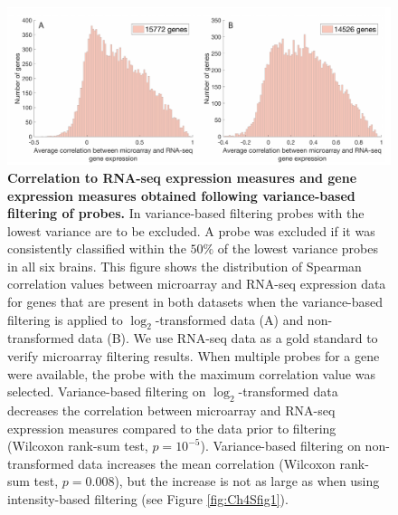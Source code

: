 \begin{figure}[h!]
  \centering
    \includegraphics[width=1\textwidth]{Chapter4/FigureS3.pdf}
\caption{\textbf{Correlation to RNA-seq expression measures and gene expression measures obtained following variance-based filtering of probes.}
In variance-based filtering probes with the lowest variance are to be excluded. A probe was excluded if it was consistently classified within the $50\%$ of the  lowest variance probes in all six brains. This figure shows the distribution of Spearman correlation values between microarray and RNA-seq expression data for genes that are present in both datasets when the variance-based filtering is applied to $\log_2$-transformed data (A) and non-transformed data (B). We use RNA-seq data as a gold standard to verify microarray filtering results. When multiple probes for a gene were available, the probe with the maximum correlation value was selected. Variance-based filtering on $\log_2$-transformed data decreases the correlation between microarray and RNA-seq expression measures compared to the data prior to filtering (Wilcoxon rank-sum test, $p = 10^{-5}$). Variance-based filtering on non-transformed data increases the mean correlation (Wilcoxon rank-sum test, $p = 0.008$), but the increase is not as large as when using intensity-based filtering (see Figure \ref{fig:Ch4Sfig1}).}
\label{fig:Ch4Sfig3}
\end{figure}

